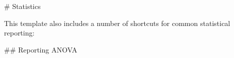 \begin{markdown}

# Statistics

This template also includes a number of shortcuts for common statistical reporting: 

\by 



## Reporting ANOVA



\end{markdown}